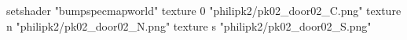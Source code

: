 setshader "bumpspecmapworld"
    texture 0 "philipk2/pk02_door02_C.png"
    texture n "philipk2/pk02_door02_N.png"
    texture s "philipk2/pk02_door02_S.png"